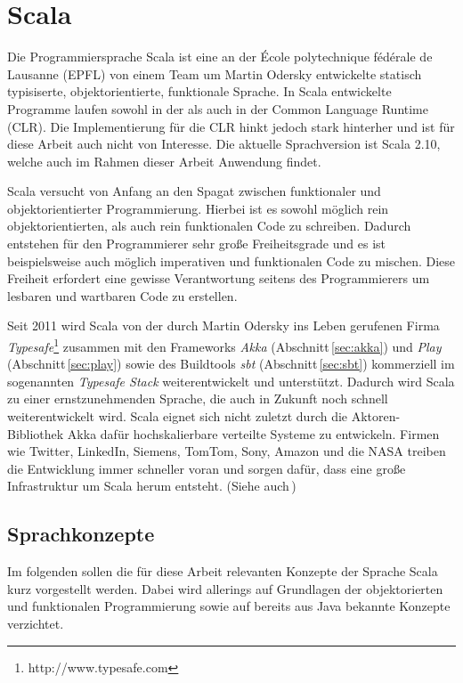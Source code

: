 \section{Scala}

Die Programmiersprache Scala ist eine an der École polytechnique fédérale de Lausanne (EPFL) von
einem Team um Martin Odersky entwickelte statisch typisiserte,  objektorientierte, funktionale
Sprache. In Scala entwickelte Programme laufen  sowohl in der  als auch in der Common
Language Runtime (CLR). Die Implementierung für die CLR hinkt jedoch stark  hinterher und ist für
diese Arbeit auch nicht von Interesse. Die aktuelle Sprachversion ist Scala 2.10, welche auch im
Rahmen dieser Arbeit Anwendung findet.

Scala versucht von Anfang an den Spagat zwischen funktionaler und  objektorientierter
Programmierung. Hierbei ist es sowohl möglich  rein objektorientierten, als auch rein funktionalen
Code zu schreiben. Dadurch  entstehen für den Programmierer sehr große Freiheitsgrade und es ist
beispielsweise auch möglich imperativen und funktionalen Code zu mischen. Diese  Freiheit erfordert
eine gewisse Verantwortung seitens des Programmierers um  lesbaren und wartbaren Code zu erstellen.

Seit 2011 wird Scala von der durch Martin Odersky ins Leben gerufenen Firma
\textit{Typesafe}\footnote{http://www.typesafe.com} zusammen mit den Frameworks \textit{Akka}
(Abschnitt\,\ref{sec:akka}) und \textit{Play} (Abschnitt\,\ref{sec:play}) sowie des Buildtools
\textit{sbt} (Abschnitt\,\ref{sec:sbt}) kommerziell im sogenannten \textit{Typesafe Stack}
weiterentwickelt und unterstützt. Dadurch wird Scala zu einer ernstzunehmenden Sprache, die auch in
Zukunft noch schnell weiterentwickelt wird. Scala eignet sich nicht zuletzt durch die Aktoren-
Bibliothek Akka dafür hochskalierbare verteilte Systeme zu entwickeln. Firmen wie Twitter, LinkedIn,
Siemens, TomTom, Sony, Amazon und die NASA treiben die Entwicklung immer schneller voran und sorgen
dafür, dass eine große Infrastruktur um Scala herum entsteht. (Siehe auch\,\cite{scala})

\subsection{Sprachkonzepte}

Im folgenden sollen die für diese Arbeit relevanten Konzepte der Sprache Scala kurz vorgestellt
werden. Dabei wird allerings auf Grundlagen der objektorierten und funktionalen Programmierung sowie
auf bereits aus Java bekannte Konzepte verzichtet.

